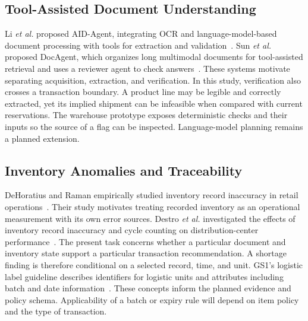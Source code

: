 \documentclass[conference]{IEEEtran}
\begin{document}
\subsection{Tool-Assisted Document Understanding}
Li \emph{et al.} proposed AID-Agent, integrating OCR and language-model-based document processing with tools for extraction and validation~\cite{aidagent}. Sun \emph{et al.} proposed DocAgent, which organizes long multimodal documents for tool-assisted retrieval and uses a reviewer agent to check answers~\cite{docagent}. These systems motivate separating acquisition, extraction, and verification. In this study, verification also crosses a transaction boundary. A product line may be legible and correctly extracted, yet its implied shipment can be infeasible when compared with current reservations. The warehouse prototype exposes deterministic checks and their inputs so the source of a flag can be inspected. Language-model planning remains a planned extension.

\subsection{Inventory Anomalies and Traceability}
DeHoratius and Raman empirically studied inventory record inaccuracy in retail operations~\cite{inventory}. Their study motivates treating recorded inventory as an operational measurement with its own error sources. Destro \emph{et al.} investigated the effects of inventory record inaccuracy and cycle counting on distribution-center performance~\cite{cycle}. The present task concerns whether a particular document and inventory state support a particular transaction recommendation. A shortage finding is therefore conditional on a selected record, time, and unit. GS1's logistic label guideline describes identifiers for logistic units and attributes including batch and date information~\cite{gs1}. These concepts inform the planned evidence and policy schema. Applicability of a batch or expiry rule will depend on item policy and the type of transaction.
\end{document}
